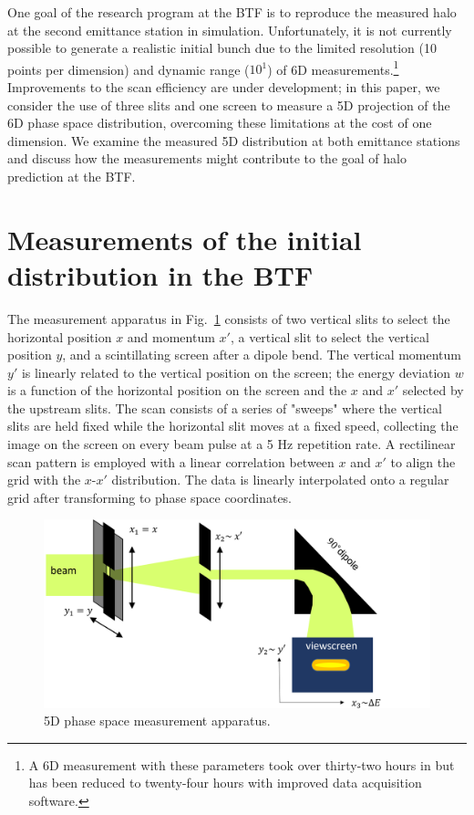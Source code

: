 \documentclass[letterpaper,
               keeplastbox,
               nospread,
               biblatex,
              ]{jacow}
\begin{document}
One goal of the research program at the BTF is to reproduce the measured halo at the second emittance station in simulation. Unfortunately, it is not currently possible to generate a realistic initial bunch due to the limited resolution (10 points per dimension) and dynamic range ($10^1$) of 6D measurements.\footnote{A 6D measurement with these parameters took over thirty-two hours in \cite{Cathey2018} but has been reduced to twenty-four hours with improved data acquisition software.} Improvements to the scan efficiency are under development; in this paper, we consider the use of three slits and one screen to measure a 5D projection of the 6D phase space distribution, overcoming these limitations at the cost of one dimension. We examine the measured 5D distribution at both emittance stations and discuss how the measurements might contribute to the goal of halo prediction at the BTF.

\section{Measurements of the initial distribution in the BTF}

The measurement apparatus in Fig.~\ref{fig:5dmeas} consists of two vertical slits to select the horizontal position $x$ and momentum $x'$, a vertical slit to select the vertical position $y$, and a scintillating screen after a dipole bend. The vertical momentum $y'$ is linearly related to the vertical position on the screen; the energy deviation $w$ is a function of the horizontal position on the screen and the $x$ and $x'$ selected by the upstream slits. The scan consists of a series of "sweeps" where the vertical slits are held fixed while the horizontal slit moves at a fixed speed, collecting the image on the screen on every beam pulse at a 5 Hz repetition rate. A rectilinear scan pattern is employed with a linear correlation between $x$ and $x'$ to align the grid with the $x$-$x'$ distribution. The data is linearly interpolated onto a regular grid after transforming to phase space coordinates.

\begin{figure}[!t]
    \centering
    \includegraphics[width=\columnwidth]{apparatus5D.png}
    \caption{5D phase space measurement apparatus.}
    \label{fig:5dmeas}
\end{figure}
\end{document}
